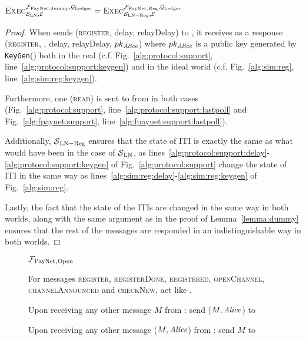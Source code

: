   \begin{lemma}
    \label{lemma:reg}
    $\textsc{Exec}^{\mathcal{F}_{\mathrm{PayNet}}{}_{\mathrm{, dummy}},
    \mathcal{G}_{\mathrm{Ledger}}}_{\mathcal{S}_{\mathrm{LN}}, \mathcal{E}} =
    \textsc{Exec}^{\mathcal{F}_{\mathrm{PayNet}}{}_{\mathrm{, Reg}},
    \mathcal{G}_{\mathrm{Ledger}}}_{\mathcal{S}_{\mathrm{LN - Reg}}, \mathcal{E}}$
  \end{lemma}

  \begin{proof}
    When \environment{} sends (\textsc{register}, delay, relayDelay) to
    \alice{}, it receives as a response (\textsc{register}, \alice, delay,
    relayDelay, $pk_{\mathit{Alice}}$) where $pk_{\mathit{Alice}}$ is a public key generated by
    \texttt{KeyGen}() both in the real (c.f. Fig.~\ref{alg:protocol:support},
    line~\ref{alg:protocol:support:keygen}) and in the ideal world (c.f.
    Fig.~\ref{alg:sim:reg}, line~\ref{alg:sim:reg:keygen}).

    Furthermore, one (\textsc{read}) is sent to \ledger{} from \alice{} in both
    cases (Fig.~\ref{alg:protocol:support},
    line~\ref{alg:protocol:support:lastpoll} and Fig.~\ref{alg:fpaynet:support},
    line~\ref{alg:fpaynet:support:lastpoll}).

    Additionally, $\mathcal{S}{}_{\mathrm{LN - Reg}}$ ensures that the state of
    \alice{} ITI is exactly the same as what would have been in the case of
    $\mathcal{S}{}_{\mathrm{LN}}$, as
    lines~\ref{alg:protocol:support:delay}-\ref{alg:protocol:support:keygen} of
    Fig.~\ref{alg:protocol:support} change the state of \alice{} ITI in the same
    way as lines~\ref{alg:sim:reg:delay}-\ref{alg:sim:reg:keygen} of
    Fig.~\ref{alg:sim:reg}.

    Lastly, the fact that the state of the \alice{} ITIs are changed in the same
    way in both worlds, along with the same argument as in the proof of
    Lemma~\ref{lemma:dummy} ensures that the rest of the messages are responded
    in an indistinguishable way in both worlds.
  \end{proof}

  \begin{figure}[H]
    \begin{systembox}{$\mathcal{F}_{\mathrm{PayNet}}{}_{\mathrm{, Open}}$}
      \begin{algorithmic}[1]
        \State For messages \textsc{register}, \textsc{registerDone},
        \textsc{registered}, \textsc{openChannel}, \textsc{channelAnnounced} and
        \textsc{checkNew}, act like \fpaynet{}.
        \Statex

        \State Upon receiving any other message $M$ from \alice:
        \Indent
            \State send ($M, \mathit{Alice}$) to \simulator
          \EndIf
        \EndIndent
        \Statex

        \State Upon receiving any other message ($M, \mathit{Alice}$) from \simulator:
        \Indent
            \State send $M$ to \alice
          \EndIf
        \EndIndent
      \end{algorithmic}
    \end{systembox}
    \caption{}
    \label{alg:fpaynet:open}
  \end{figure}


